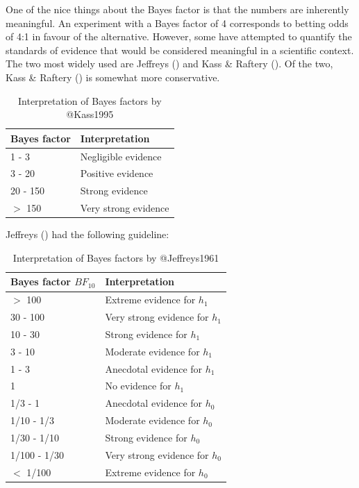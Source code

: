 \documentclass[
  11pt,
  a4paper,
  twoside,symmetric,openright]{book}
\theoremstyle{break}
\theoremstyle{break}
\begin{document}
One of the nice things about the Bayes factor is that the numbers are inherently meaningful. An experiment with a Bayes factor of 4 corresponds to betting odds of 4:1 in favour of the alternative. However, some have attempted to quantify the standards of evidence that would be considered meaningful in a scientific context. The two most widely used are Jeffreys () and Kass \& Raftery (). Of the two, Kass \& Raftery () is somewhat more conservative.

\begin{table}

\caption{\label{tab:unnamed-chunk-118}Interpretation of Bayes factors by @Kass1995}
\centering
\begin{tabular}[t]{ll}
\toprule
Bayes factor & Interpretation\\
\midrule
1 - 3 & Negligible evidence\\
3 - 20 & Positive evidence\\
20 - 150 & Strong evidence\\
$>$ 150 & Very strong evidence\\
\bottomrule
\end{tabular}
\end{table}

Jeffreys () had the following guideline:

\begin{table}

\caption{\label{tab:unnamed-chunk-119}Interpretation of Bayes factors by @Jeffreys1961}
\centering
\begin{tabular}[t]{ll}
\toprule
Bayes factor $BF_10$ & Interpretation\\
\midrule
$>$ 100 & Extreme evidence for $h_1$\\
30 - 100 & Very strong evidence for $h_1$\\
10 - 30 & Strong evidence for $h_1$\\
3 - 10 & Moderate evidence for $h_1$\\
1 - 3 & Anecdotal evidence for $h_1$\\
1 & No evidence for $h_1$\\
1/3 - 1 & Anecdotal evidence for $h_0$\\
1/10 - 1/3 & Moderate evidence for $h_0$\\
1/30 - 1/10 & Strong evidence for $h_0$\\
1/100 - 1/30 & Very strong evidence for $h_0$\\
$<$ 1/100 & Extreme evidence for $h_0$\\
\bottomrule
\end{tabular}
\end{table}
\end{document}
